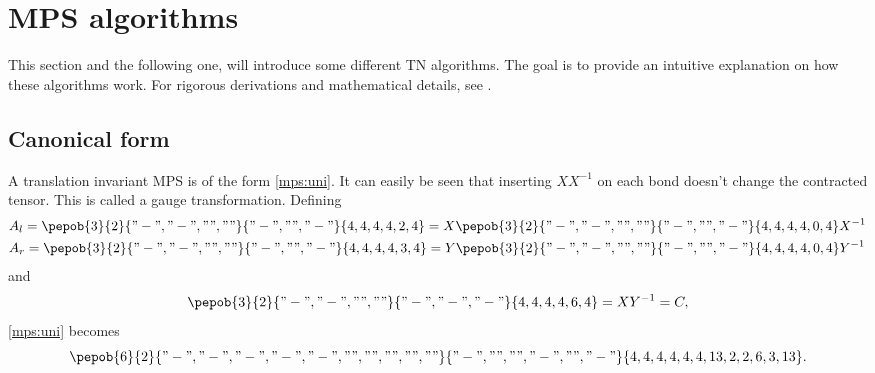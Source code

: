 \section{\Gls{MPS} algorithms}

This section and the following one, will introduce some different \Gls{TN} algorithms. The goal is to provide an intuitive explanation on how these algorithms work. For rigorous derivations and mathematical details, see  \cite{Vanderstraeten2019} .

\subsection{Canonical form}

A translation invariant \Gls{MPS} is of the form \cref{mps:uni}. It can easily be seen that inserting $X X^{-1}$ on each bond doesn't change the contracted tensor. This is called a gauge transformation. Defining
\begin{equation}
    \begin{split}
        &A_l = \pepob{3}{2}{{
                    "-","-",
                    "",""}}{{
                    "-",
                    "",
                    "-"}}{{
                    4,4,4,
                    4,2,4}}  =X \pepob{3}{2}{{
                    "-","-",
                    "",""}}{{
                    "-",
                    "",
                    "-"}}{{
                    4,4,4,
                    4,0,4}} X^{-1} \\
        &A_r = \pepob{3}{2}{{
                    "-","-",
                    "",""}}{{
                    "-",
                    "",
                    "-"}}{{
                    4,4,4,
                    4,3,4}}=Y \pepob{3}{2}{{
                    "-","-",
                    "",""}}{{
                    "-",
                    "",
                    "-"}}{{
                    4,4,4,
                    4,0,4}} Y^{-1}
    \end{split}
\end{equation}
and
\begin{equation}
    \pepob{3}{2}{{
                "-","-",
                "",""}}{{
                "-",
                "-",
                "-"}}{{
                4,4,4,
                4,6,4}}  = X Y^{-1} = C ,
\end{equation}
\cref{mps:uni}  becomes
\begin{equation}
    \pepob{6}{2}{{
                "-","-", "-","-","-",
                "","","","",""}}{{
                "-",
                "",
                "",
                "-",
                "",
                "-"}}{{
                4,4,4,4,4,4,
                13,2,2,6,3,13}} .
\end{equation}

